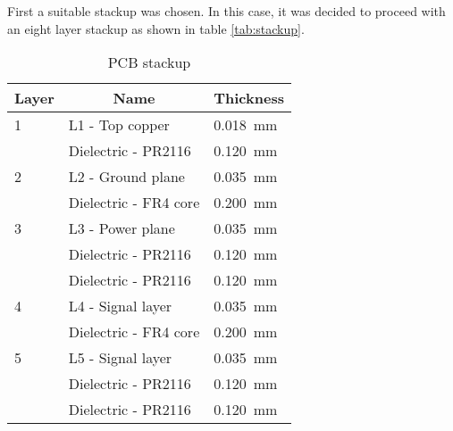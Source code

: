 First a suitable stackup was chosen. In this case, it was decided to proceed with an eight layer stackup as shown in table \ref{tab:stackup}. 
\FloatBarrier
\begin{table}[]
    \caption{PCB stackup}
    \begin{tabular}{|l|l|l|}
    \hline
    \multicolumn{1}{|c|}{\textbf{Layer}} & \multicolumn{1}{c|}{\textbf{Name}} & \multicolumn{1}{c|}{\textbf{Thickness}} \\ \hline
    1                                    & L1 - Top copper                    & \SI{0.018}{\milli\meter}                                   \\ \hline
                                         & Dielectric - PR2116                & \SI{0.120}{\milli\meter}                                   \\ \hline
    2                                    & L2 - Ground plane                  & \SI{0.035}{\milli\meter}                                   \\ \hline
                                         & Dielectric - FR4 core              & \SI{0.200}{\milli\meter}                                   \\ \hline
    3                                    & L3 - Power plane                   & \SI{0.035}{\milli\meter}                                   \\ \hline
                                         & Dielectric - PR2116                & \SI{0.120}{\milli\meter}                                   \\ \hline
                                         & Dielectric - PR2116                & \SI{0.120}{\milli\meter}                                   \\ \hline
    4                                    & L4 - Signal layer                  & \SI{0.035}{\milli\meter}                                   \\ \hline
                                         & Dielectric - FR4 core              & \SI{0.200}{\milli\meter}                                   \\ \hline
    5                                    & L5 - Signal layer                  & \SI{0.035}{\milli\meter}                                   \\ \hline
                                         & Dielectric - PR2116                & \SI{0.120}{\milli\meter}                                   \\ \hline
                                         & Dielectric - PR2116                & \SI{0.120}{\milli\meter}                                   \\ \hline

\end{tabular}
\end{table}
